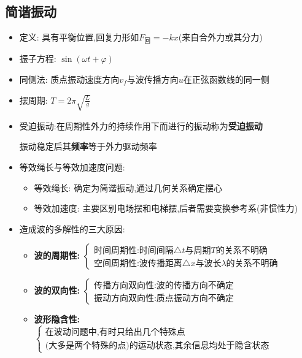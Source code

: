\documentclass{article}
\begin{document}
\subsection{简谐振动}
\begin{itemize}
    \item 定义: 具有平衡位置,回复力形如$F_{\text{回}} = -kx$(来自合外力或其分力)
    \item 振子方程: $\sin{(\omega t + \varphi)}$
    \item 同侧法: 质点振动速度方向$v_{f}$与波传播方向$u$在正弦函数线的同一侧
    \item 摆周期: $T = 2\pi \sqrt{\frac{L}{g}}$
    \item 受迫振动:在周期性外力的持续作用下而进行的振动称为\textbf{受迫振动}

          \hspace{4.7em}振动稳定后其\textbf{频率}等于外力驱动频率
    \item 等效绳长与等效加速度问题:
          \begin{itemize}
              \item 等效绳长: 确定为简谐振动,通过几何关系确定摆心
              \item 等效加速度: 主要区别电场摆和电梯摆,后者需要变换参考系(非惯性力)
          \end{itemize}
    \item  造成波的多解性的三大原因:
          \begin{itemize}
              \item \textbf{波的周期性:}\hspace{1em}
                    $\begin{cases}
                            \text{时间周期性:时间间隔}\triangle t \text{与周期} T \text{的关系不明确} \\
                            \text{空间周期性:波传播距离}\triangle x \text{与波长} \lambda \text{的关系不明确}
                        \end{cases}$

              \item \textbf{波的双向性:}\hspace{1em}
                    $\begin{cases}
                            \text{传播方向双向性:波的传播方向不确定} \\
                            \text{振动方向双向性:质点振动方向不确定}
                        \end{cases}$

              \item \textbf{波形隐含性:}\hspace{1em}
                    $\begin{cases}
                            \text{在波动问题中,有时只给出几个特殊点} \\
                            \text{(大多是两个特殊的点)的运动状态,其余信息均处于隐含状态}
                        \end{cases}$
          \end{itemize}
\end{itemize}
\end{document}
